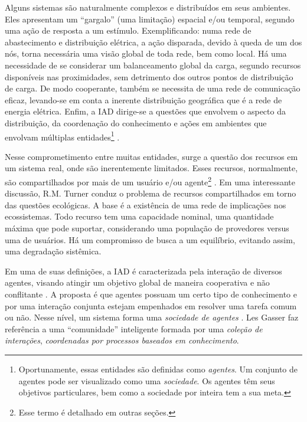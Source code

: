 \documentclass[12pt,final,a4paper]{article}
\theoremstyle{definition}
\begin{document}
Alguns sistemas são naturalmente complexos e distribuídos em seus
ambientes. Eles apresentam um ``gargalo'' (uma limitação) espacial
e/ou temporal,  segundo uma ação de resposta a um estímulo.
Exemplificando:  numa rede de abastecimento e distribuição
elétrica, a ação disparada, devido  \`{a}   queda de um dos n\'{o}s,
torna necess\'{a}ria uma visão global de toda rede, bem como local.
H\'{a} uma necessidade de se considerar um balanceamento global da carga,
segundo recursos disponíveis nas proximidades, sem detrimento dos
outros pontos de distribuição de carga. De modo cooperante,
também se necessita de uma rede de comunicação eficaz,
levando-se em conta a inerente distribuição geogr\'{a}fica que é
a rede de energia elétrica. Enfim, a  IAD dirige-se a questões que
envolvem o aspecto da distribuição, da coordenação do
conhecimento e ações em ambientes que envolvam m\'{u}ltiplas
entidades\footnote{Oportunamente,  essas entidades s\~ao definidas como 
{\em agentes}. Um
conjunto de agentes pode ser visualizado como uma {\em sociedade}. Os agentes
t\^em seus objetivos particulares, bem como a sociedade por inteira tem a sua
meta.} \cite{draa95a}.

Nesse comprometimento entre muitas entidades, surge a questão dos
recursos em um sistema real,  onde  são inerentemente limitados.
Esses recursos,  normalmente,  são compartilhados por mais de um
usu\'{a}rio e/ou agente\footnote{Esse termo \'e detalhado em outras 
seç\~oes.} \cite{turner93b}. Em uma
interessante discussão,  R.M. Turner \cite{turner93b} conduz o problema de
recursos compartilhados em torno das  questões ecol\'{o}gicas.
A base é a exist\^{e}ncia de uma rede de implicações nos
ecossistemas. Todo recurso tem uma capacidade nominal, uma quantidade
m\'{a}xima que pode suportar, considerando uma população de
provedores versus uma de usu\'{a}rios. H\'{a} um compromisso de busca a um
equilíbrio, evitando assim, uma degradação sist\^{e}mica.

Em uma de suas definições, a IAD é caracterizada pela interação de diversos 
agentes, visando atingir um objetivo global de maneira
cooperativa e não conflitante \cite{hogg91,gashu89}. A proposta é
que agentes possuam um certo tipo de conhecimento e por uma
interação conjunta estejam empenhados em resolver uma tarefa comum
ou não. Nesse nível, um sistema forma uma {\em sociedade de agentes
} \cite{berthet92}. Les Gasser \cite{gasser91a} faz refer\^{e}ncia a uma
``comunidade'' inteligente formada por uma {\em coleção de 
interações}, {\em coordenadas por processos baseados em conhecimento}.
\end{document}
